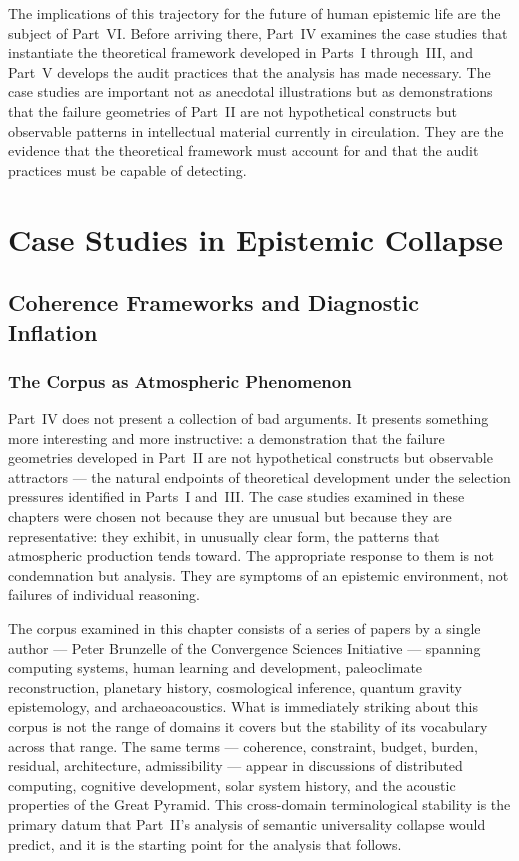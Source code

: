 \documentclass[12pt, openright, twoside]{book}
\begin{document}
The implications of this trajectory for the future
of human epistemic life are the subject of Part~VI.
Before arriving there, Part~IV examines the case
studies that instantiate the theoretical framework
developed in Parts~I through~III, and Part~V develops
the audit practices that the analysis has made
necessary. The case studies are important not as
anecdotal illustrations but as demonstrations that
the failure geometries of Part~II are not hypothetical
constructs but observable patterns in intellectual
material currently in circulation. They are the
evidence that the theoretical framework must account
for and that the audit practices must be capable
of detecting.

\clearpage

\part{Case Studies in Epistemic Collapse}

\chapter{Coherence Frameworks and Diagnostic Inflation}

\section{The Corpus as Atmospheric Phenomenon}

Part~IV does not present a collection of bad arguments. It presents something more
interesting and more instructive: a demonstration that the failure geometries developed
in Part~II are not hypothetical constructs but observable attractors --- the natural
endpoints of theoretical development under the selection pressures identified in
Parts~I and~III. The case studies examined in these chapters were chosen not
because they are unusual but because they are representative: they exhibit, in
unusually clear form, the patterns that atmospheric production tends toward. The
appropriate response to them is not condemnation but analysis. They are symptoms
of an epistemic environment, not failures of individual reasoning.

The corpus examined in this chapter consists of a series of papers by a single
author --- Peter Brunzelle of the Convergence Sciences Initiative --- spanning
computing systems, human learning and development, paleoclimate reconstruction,
planetary history, cosmological inference, quantum gravity epistemology, and
archaeoacoustics. What is immediately striking about this corpus is not the range
of domains it covers but the stability of its vocabulary across that range. The
same terms --- coherence, constraint, budget, burden, residual, architecture,
admissibility --- appear in discussions of distributed computing, cognitive
development, solar system history, and the acoustic properties of the Great
Pyramid. This cross-domain terminological stability is the primary datum that
Part~II's analysis of semantic universality collapse would predict, and it is the
starting point for the analysis that follows.
\end{document}
